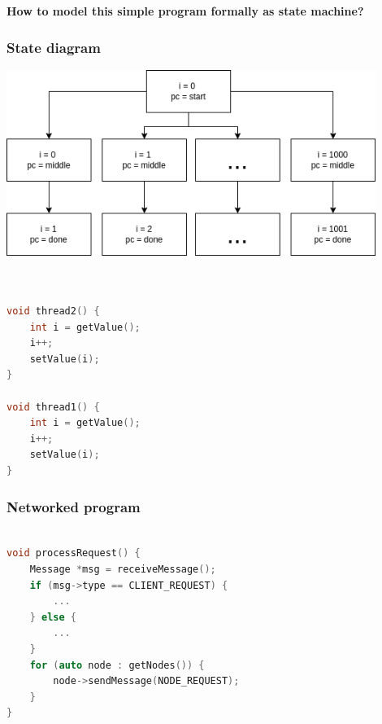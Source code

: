 \documentclass{beamer}
\begin{document}
\begin{frame}
    \begin{center}
        \LARGE{\textbf{How to model this simple program formally as state machine?}}
    \end{center}

\end{frame}

\begin{frame}
    \frametitle{State diagram}
    \includegraphics[width=0.9\textwidth, height=0.9\textheight]{img/1.png}
\end{frame}


\begin{frame}[fragile]
	\begin{lstlisting}[language=C++]


void thread2() {
    int i = getValue();
    i++;
    setValue(i);
}

void thread1() {
    int i = getValue();
    i++;
    setValue(i);
}

	\end{lstlisting}
	
\end{frame}

\begin{frame}[fragile]
    \frametitle{Networked program}
	\begin{lstlisting}[language=C++]

void processRequest() {
    Message *msg = receiveMessage();
    if (msg->type == CLIENT_REQUEST) {
        ...
    } else {
        ...
    }
    for (auto node : getNodes()) {
        node->sendMessage(NODE_REQUEST);
    }
}

	\end{lstlisting}
	
\end{frame}
\end{document}
